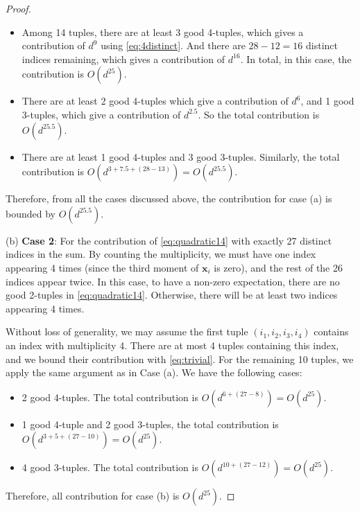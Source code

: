\documentclass[twoside,11pt]{article}
\def\bx{{\boldsymbol x}}
\newcommand{\1}{\mathbf{1}}
\begin{document}
\begin{proof}
\begin{itemize}
    
    \item Among 14 tuples, there are at least 3 good 4-tuples, which gives a contribution of $d^{9}$ using \eqref{eq:4distinct}. And there are $28-12=16$ distinct indices remaining, which gives a contribution of $d^{16}$. In total, in this case, the contribution is $O(d^{25})$.
    \item There are at least  2 good 4-tuples which give a contribution of $d^6$, and 1 good 3-tuples, which give a contribution of $d^{2.5}$. So the total contribution is $O(d^{25.5})$.
    \item There are at least 1 good 4-tuples and 3 good 3-tuples. Similarly, the total contribution is $O(d^{3+7.5+(28-13)})=O(d^{25.5})$.
\end{itemize}
Therefore, from all the cases discussed above, the contribution for case (a) is bounded by $O(d^{25.5})$.



   (b) \textbf{Case 2}: For the contribution of \eqref{eq:quadratic14} with exactly 27 distinct indices in the sum. By counting the multiplicity,  we must have one index appearing 4 times (since the third moment of $\bx_i$ is zero), and the rest of the 26 indices appear twice. In this case, to have a non-zero expectation, there are no good 2-tuples in \eqref{eq:quadratic14}. Otherwise, there will be at least two indices appearing 4 times.
   
   
   Without loss of generality, we may assume the first tuple $(i_1,i_2,i_3,i_4)$ contains an index with multiplicity 4. There are at most 4 tuples containing this index, and we bound their contribution with \eqref{eq:trivial}. For the remaining 10 tuples, we apply the same argument as in Case (a). We have the following cases:
   \begin{itemize}
       \item 2 good 4-tuples. The total contribution is $O(d^{6+(27-8)})=O(d^{25})$.
       \item 1 good 4-tuple and 2 good 3-tuples, the total contribution is $O(d^{3+5+(27-10)})=O(d^{25})$.
       \item 4 good 3-tuples. The total contribution is $O(d^{10+(27-12)})=O(d^{25})$.
   \end{itemize}
   Therefore, all contribution for case (b) is $O(d^{25})$.


  


\end{proof}
\end{document}
